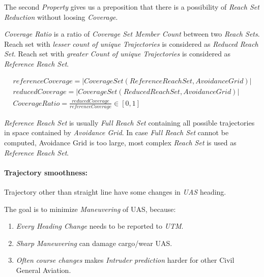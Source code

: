 The second \emph{Property} gives us a preposition that there is a possibility of \emph{Reach Set Reduction} without loosing 
\emph{Coverage}.  

\begin{definition}\label{def:coverageRatio}
    \emph{Coverage Ratio} is a ratio of \emph{Coverage Set Member Count} between two \emph{Reach Sets}. Reach set with \emph{lesser count of unique Trajectories} is considered as \emph{Reduced Reach Set}.  Reach set with \emph{greater Count of unique Trajectories} is considered as \emph{Reference Reach Set}.
    
    \begin{equation}\label{eq:CoverageRatio} 
        \begin{gathered}
            referenceCoverage=|CoverageSet(ReferenceReachSet,AvoidanceGrid)|\\
            reducedCoverage=|CoverageSet(ReducedReachSet,AvoidanceGrid)|\\
            CoverageRatio = \frac{reducedCoverage}{referenceCoverage}\in[0,1]
        \end{gathered}
    \end{equation}
\end{definition}

\begin{note}
    \emph{Reference Reach Set} is usually \emph{Full Reach Set} containing all possible trajectories in space contained by \emph{Avoidance Grid}. In case \emph{Full Reach Set} cannot be computed, Avoidance Grid is too large, most complex \emph{Reach Set} is used as \emph{Reference Reach Set}.
\end{note}

\paragraph{Trajectory smoothness:} Trajectory other than straight line have some changes in \emph{UAS} heading. 

The goal is to minimize \emph{Maneuvering} of UAS, because:
\begin{enumerate}
    \item \emph{Every Heading Change} needs to be reported to \emph{UTM}.
    \item \emph{Sharp Maneuvering} can damage cargo/wear UAS.
    \item \emph{Often course changes} makes \emph{Intruder prediction} harder for other Civil General Aviation.
\end{enumerate}

